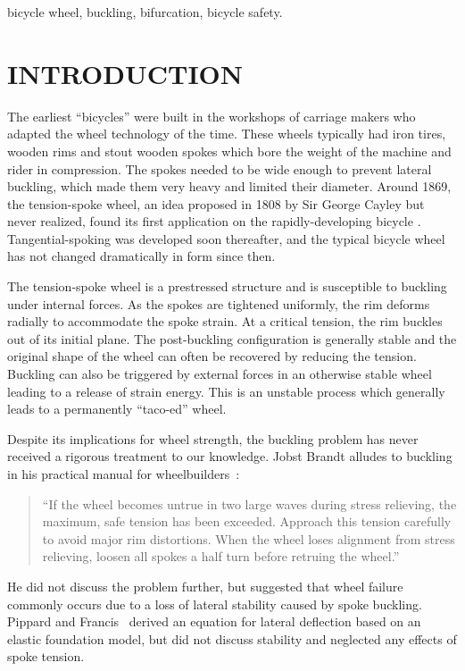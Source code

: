 \documentclass{bmd2016p}
\begin{document}
\begin{keywords}
bicycle wheel, 
buckling, 
bifurcation,
bicycle safety.
\end{keywords}



\section{INTRODUCTION}
The earliest ``bicycles'' were built in the workshops of carriage makers who adapted the wheel technology of the time. These wheels typically had iron tires, wooden rims and stout wooden spokes which bore the weight of the machine and rider in compression. The spokes needed to be wide enough to prevent lateral buckling, which made them very heavy and limited their diameter. Around 1869, the tension-spoke wheel, an idea proposed in 1808 by Sir George Cayley but never realized, found its first application on the rapidly-developing bicycle \cite{Ackroyd2011a,Clayton1991a}. Tangential-spoking was developed soon thereafter, and the typical bicycle wheel has not changed dramatically in form since then.

The tension-spoke wheel is a prestressed structure and is susceptible to buckling under internal forces. As the spokes are tightened uniformly, the rim deforms radially to accommodate the spoke strain. At a critical tension, the rim buckles out of its initial plane. The post-buckling configuration is generally stable and the original shape of the wheel can often be recovered by reducing the tension. Buckling can also be triggered by external forces in an otherwise stable wheel leading to a release of strain energy. This is an unstable process which generally leads to a permanently ``taco-ed'' wheel.

Despite its implications for wheel strength, the buckling problem has never received a rigorous treatment to our knowledge. Jobst Brandt alludes to buckling in his practical manual for wheelbuilders~\cite{Brandt1993c}:

\begin{quotation}
\noindent``If the wheel becomes untrue in two large waves during stress relieving, the maximum, safe tension has been exceeded. Approach this tension carefully to avoid major rim distortions. When the wheel loses alignment from stress relieving, loosen all spokes a half turn before retruing the wheel.''
\end{quotation}

He did not discuss the problem further, but suggested that wheel failure commonly occurs due to a loss of lateral stability caused by spoke buckling. Pippard and Francis~\cite{Pippard1932d} derived an equation for lateral deflection based on an elastic foundation model, but did not discuss stability and neglected any effects of spoke tension.
\end{document}
